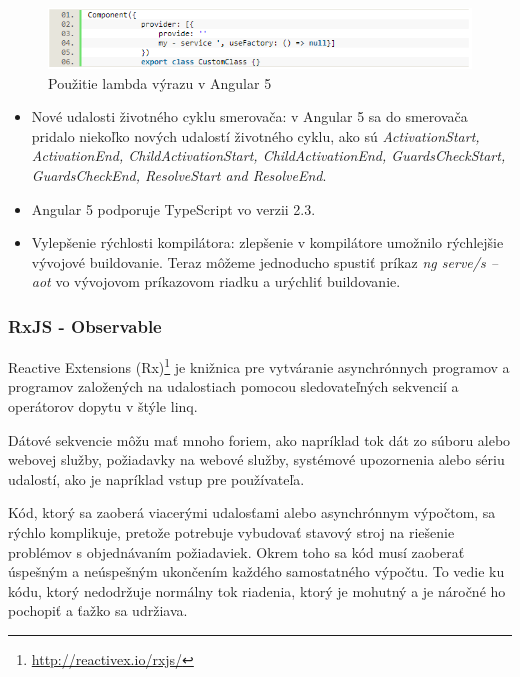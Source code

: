 \begin{figure}[ht]
  \centering
  \includegraphics[width=1\columnwidth]{img/ng5_diff_4.png}
  \caption{\label{fig:ng_diff_4} Použitie lambda výrazu v Angular 5}
\end{figure}

\newpage
\begin{itemize}
\item Nové udalosti životného cyklu smerovača: 
v Angular 5 sa do smerovača pridalo niekoľko nových udalostí životného cyklu, ako sú 
\textit{ActivationStart, ActivationEnd,  ChildActivationStart, ChildActivationEnd, GuardsCheckStart, 
GuardsCheckEnd, ResolveStart and ResolveEnd}.
\item Angular 5 podporuje TypeScript vo verzii 2.3.
\item Vylepšenie rýchlosti kompilátora: 
zlepšenie v kompilátore umožnilo rýchlejšie vývojové buildovanie. Teraz môžeme 
jednoducho spustiť príkaz \textit{ng serve/s --aot } vo vývojovom príkazovom riadku 
a urýchliť buildovanie.
\end{itemize}

\subsubsection{RxJS - Observable}
\label{subsubsec:rxjs}

Reactive Extensions (Rx)\footnote{\url{http://reactivex.io/rxjs/}} je knižnica pre vytváranie
asynchrónnych programov a programov založených na udalostiach pomocou sledovateľných
sekvencií a operátorov dopytu v štýle \acrshort{linq}.

Dátové sekvencie môžu mať mnoho foriem, ako napríklad tok dát zo súboru 
alebo webovej služby, požiadavky na webové služby, systémové upozornenia
alebo sériu udalostí, ako je napríklad vstup pre používateľa.

Kód, ktorý sa zaoberá viacerými udalosťami alebo asynchrónnym výpočtom, sa rýchlo komplikuje,
pretože potrebuje vybudovať stavový stroj na riešenie problémov s objednávaním požiadaviek. 
Okrem toho sa kód musí zaoberať úspešným a neúspešným ukončením každého samostatného výpočtu. 
To vedie ku kódu, ktorý nedodržuje normálny tok riadenia, ktorý je mohutný a je náročné ho pochopiť
a ťažko sa udržiava.

